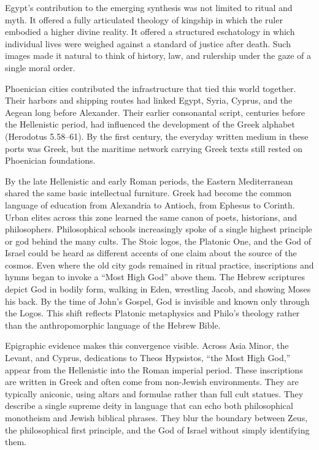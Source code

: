 Egypt's contribution to the emerging synthesis was not limited to ritual and myth.
It offered a fully articulated theology of kingship in which the ruler embodied a higher divine reality.
It offered a structured eschatology in which individual lives were weighed against a standard of justice after death.
Such images made it natural to think of history, law, and rulership under the gaze of a single moral order.

Phoenician cities contributed the infrastructure that tied this world together.
Their harbors and shipping routes had linked Egypt, Syria, Cyprus, and the Aegean long before Alexander.
Their earlier consonantal script, centuries before the Hellenistic period, had influenced the development of the Greek alphabet (Herodotus 5.58--61).
By the first century, the everyday written medium in these ports was Greek, but the maritime network carrying Greek texts still rested on Phoenician foundations.

By the late Hellenistic and early Roman periods, the Eastern Mediterranean shared the same basic intellectual furniture.
Greek had become the common language of education from Alexandria to Antioch, from Ephesus to Corinth.
Urban elites across this zone learned the same canon of poets, historians, and philosophers.
Philosophical schools increasingly spoke of a single highest principle or god behind the many cults.
The Stoic logos, the Platonic One, and the God of Israel could be heard as different accents of one claim about the source of the cosmos.
Even where the old city gods remained in ritual practice, inscriptions and hymns began to invoke a ``Most High God'' above them.
The Hebrew scriptures depict God in bodily form, walking in Eden, wrestling Jacob, and showing Moses his back.
By the time of John's Gospel, God is invisible and known only through the Logos.
This shift reflects Platonic metaphysics and Philo's theology rather than the anthropomorphic language of the Hebrew Bible.

Epigraphic evidence makes this convergence visible.
Across Asia Minor, the Levant, and Cyprus, dedications to Theos Hypsistos, ``the Most High God,'' appear from the Hellenistic into the Roman imperial period.
These inscriptions are written in Greek and often come from non-Jewish environments.
They are typically aniconic, using altars and formulae rather than full cult statues.
They describe a single supreme deity in language that can echo both philosophical monotheism and Jewish biblical phrases.
They blur the boundary between Zeus, the philosophical first principle, and the God of Israel without simply identifying them.

